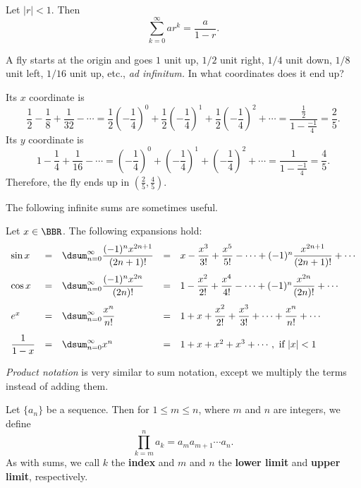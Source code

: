 \begin{thm}
Let $|r| < 1$.  Then 
$$\sum_{k=0}^{\infty} ar^k  =  \frac{a}{1 - r}.$$
\end{thm}

\begin{exa} 
A fly starts at the origin and goes $1$ unit up, $1/2$ unit right, $1/4$ unit down, $1/8$ unit left,
$1/16$ unit up, etc., {\em ad infinitum.} In what coordinates does
it end up?
\begin{sol}
Its $x$ coordinate is
$$
\frac{1}{2} - \frac{1}{8} + \frac{1}{32} - \cdots=
\frac{1}{2}\left(-\frac{1}{4}\right)^0 + \frac{1}{2}\left(-\frac{1}{4}\right)^1 + \frac{1}{2}\left(-\frac{1}{4}\right)^2 + \cdots
= \frac{\frac{1}{2}}{1 - \frac{-1}{4}} = \frac{2}{5}.$$ 
Its $y$ coordinate is
$$1 - \frac{1}{4} + \frac{1}{16} - \cdots =
\left(-\frac{1}{4}\right)^0 +\left(-\frac{1}{4}\right)^1 + \left(-\frac{1}{4}\right)^2 +\cdots =
 \frac{1}{1 - \frac{-1}{4}} = \frac{4}{5}.$$Therefore, the
fly ends up in $\left(\frac{2}{5}, \frac{4}{5}\right).$
\end{sol}
\end{exa}


The following infinite sums are sometimes useful.
\begin{thm}
Let $x\in \BBR$.  The following expansions hold:
$$
\begin{array}{lllll} 
\sin x &=&\dsum _{n=0} ^{\infty}\dfrac{(-1)^nx^{2n+1}}{(2n+1)!}&=& x - \dfrac{x^3}{3!} + \dfrac{x^5}{5!} - \cdots + (-1)^n\dfrac{x^{2n + 1}}{(2n + 1)!} +  \cdots\\[3ex]
\cos x &=&\dsum _{n=0} ^{\infty}\dfrac{(-1)^nx^{2n}}{(2n)!} &=&1 -
\dfrac{x^2}{2!} + \dfrac{x^4}{4!} - \cdots +(-1)^n\dfrac{x^{2n}}{(2n)!} +  \cdots \\[3ex]
e^x&=&\dsum _{n=0} ^{\infty}\dfrac{x^n}{n!}
&=& 1 + x + \dfrac{x^2}{2!} +  \dfrac{x^3}{3!} + \cdots + \dfrac{x^{n}}{n!}+  \cdots\\[3ex]
\dfrac{1}{1-x}&=&\dsum _{n=0} ^{\infty}x^n&=&1+x+x^2+x^3+\cdots, \mbox{ if } |x|<1
\end{array}
$$
\label{thm:maclaurin}
\end{thm}


{\em Product notation} is very similar to sum notation, except we multiply the terms instead of 
adding them.

\begin{df}
Let $\{a_n\}$ be a sequence.  Then for $1\leq m\leq n$,
where $m$ and $n$ are integers,
we define
$$\prod _{k=m} ^n a_k= a_{m}a_{m+1}\cdots a_n.$$
As with sums, we call $k$ the {\bf index} and 
$m$ and $n$ the {\bf lower limit} and {\bf upper limit}, respectively.
\end{df}

